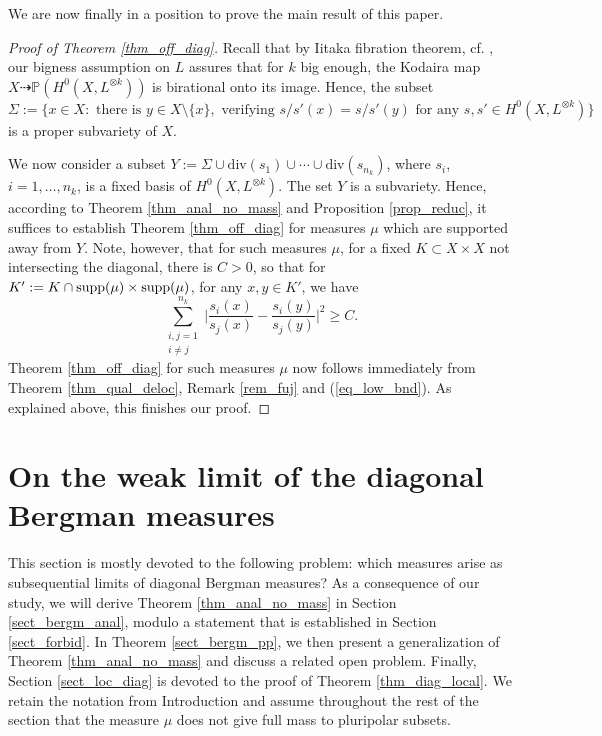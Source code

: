 \documentclass[12pt]{article}
\numberwithin{equation}{section}
\theoremstyle{theorem}
\theoremstyle{definition}
\theoremstyle{remark}
\begin{document}
	We are now finally in a position to prove the main result of this paper.
	\begin{proof}[Proof of Theorem \ref{thm_off_diag}]
		\begin{sloppypar}
		Recall that by Iitaka fibration theorem, cf. \cite[Theorem 2.1.33 and Definition 2.2.1]{LazarBookI}, our bigness assumption on $L$ assures that for $k$ big enough, the Kodaira map $X \dashrightarrow \mathbb{P}(H^0(X, L^{\otimes k}))$ is birational onto its image.
		Hence, the subset $\Sigma := \{ x \in X : \text{ there is } y \in X \setminus \{x\}, \text{ verifying } s/s'(x) = s/s'(y) \text{ for any } s, s' \in H^0(X, L^{\otimes k}) \}$ is a proper subvariety of $X$.
		\end{sloppypar}
		\par 
		We now consider a subset $Y := \Sigma \cup {\textrm{div}}(s_1) \cup \cdots \cup {\textrm{div}}(s_{n_k})$, where $s_i$, $i = 1, \ldots, n_k$, is a fixed basis of $H^0(X, L^{\otimes k})$.
		The set $Y$ is a subvariety.
		Hence, according to Theorem \ref{thm_anal_no_mass} and Proposition \ref{prop_reduc}, it suffices to establish Theorem \ref{thm_off_diag} for measures $\mu$ which are supported away from $Y$.
		Note, however, that for such measures $\mu$, for a fixed $K \subset X \times X$ not intersecting the diagonal, there is $C > 0$, so that for $K' := K \cap {\rm{supp}}(\mu) \times {\rm{supp}}(\mu)$, for any $x, y \in K'$, we have
		\begin{equation}\label{eq_low_bnd}
			\sum_{\substack{i, j = 1 \\ i \neq j}}^{n_k}
			\Big| \frac{s_i(x)}{s_j(x)} - \frac{s_i(y)}{s_j(y)} \Big|^2
			\geq 
			C.
		\end{equation}		
		Theorem \ref{thm_off_diag} for such measures $\mu$ now follows immediately from Theorem \ref{thm_qual_deloc}, Remark \ref{rem_fuj} and (\ref{eq_low_bnd}).
		As explained above, this finishes our proof.
	\end{proof}
	
	\section{On the weak limit of the diagonal Bergman measures}\label{sect_cd_diag}
	This section is mostly devoted to the following problem: which measures arise as subsequential limits of diagonal Bergman measures?
	As a consequence of our study, we will derive Theorem \ref{thm_anal_no_mass} in Section \ref{sect_bergm_anal}, modulo a statement that is established in Section \ref{sect_forbid}.
	In Theorem \ref{sect_bergm_pp}, we then present a generalization of Theorem \ref{thm_anal_no_mass} and discuss a related open problem.
	Finally, Section \ref{sect_loc_diag} is devoted to the proof of Theorem \ref{thm_diag_local}.
	We retain the notation from Introduction and assume throughout the rest of the section that the measure $\mu$ does not give full mass to pluripolar subsets.
	
\end{document}
